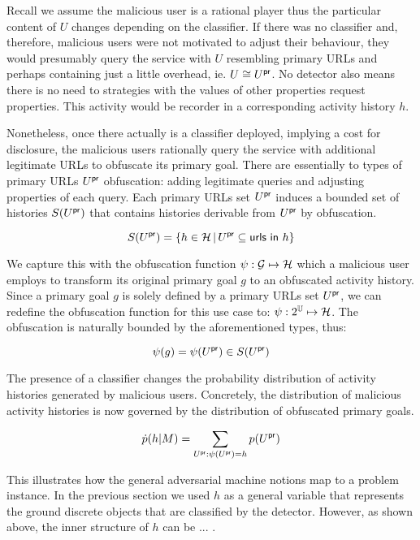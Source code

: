 Recall we assume the malicious user is a rational player thus the particular content of $U$ changes depending on the classifier. If there was no classifier and, therefore, malicious users were not motivated to
adjust their behaviour, they would presumably query the service with $U$
resembling primary URLs and perhaps containing just a little
overhead, ie. $U \cong U^{\mathsf{pr}}$. No detector also means there is no need to strategies with the values of other properties request properties. This activity would be recorder in a corresponding activity history $h$.

Nonetheless, once there actually is a classifier deployed, implying a
cost for disclosure, the malicious users rationally query the service with additional legitimate URLs to obfuscate its primary goal. There are essentially to types of primary URLs $U^{\mathsf{pr}}$ obfuscation: adding legitimate queries and adjusting properties of each query. Each primary URLs set $U^{\mathsf{pr}}$ induces a bounded set of histories $S(U^{\mathsf{pr}})$ that contains histories derivable from
$U^{\mathsf{pr}}$ by obfuscation.

\begin{equation}
S(U^{\mathsf{pr}}) = \{ h \in \mathcal{H} \,|\, U^{\mathsf{pr}} \subseteq \textsf{urls in }h \}
\end{equation}

We capture this with the obfuscation function $\psi: \mathcal{G} \mapsto \mathcal{H} $ which a malicious user employs to transform its original primary goal $g$ to an
obfuscated activity history. Since a primary goal $g$ is solely defined by a primary URLs set $U^{\mathsf{pr}}$, we can redefine the obfuscation function for this use case to: $\psi: 2^{\mathbb{U}} \mapsto \mathcal{H}$. The obfuscation is naturally bounded by the aforementioned types, thus:

\begin{equation}
    \psi(g) = \psi(U^{\mathsf{pr}}) \in S( U^{\mathsf{pr}} )
\end{equation}

The presence of a classifier changes the probability distribution of activity histories generated by malicious users. Concretely, the distribution of malicious activity histories is now governed by the distribution of obfuscated primary goals.

\begin{equation}
\dot{p}(h | M) = \sum_{U^{\mathsf{pr}} : \psi(U^{\mathsf{pr}}) = h} p(U^{\mathsf{pr}})
\end{equation}

This illustrates how the general adversarial machine notions map to a problem instance. In the previous section we used $h$ as a general variable that represents the ground discrete objects that are classified by the detector. However, as shown above, the inner structure of $h$ can be ...
.

